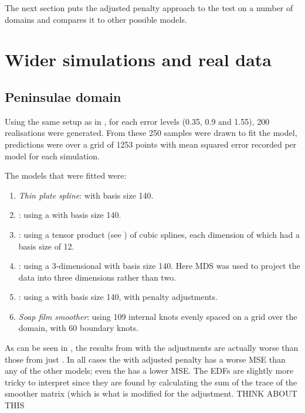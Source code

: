 The next section puts the adjusted penalty approach to the test on a number of domains and compares it to other possible models.

\section{Wider simulations and real data}

\subsection{Peninsulae domain}
\label{wt2bigsim}

Using the same setup as in , for each error levels (0.35, 0.9 and 1.55), 200 realisations were generated. From these 250 samples were drawn to fit the model, predictions were over a grid of 1253 points with mean squared error recorded per model for each simulation. 

The models that were fitted were:
\begin{enumerate}
\item \emph{Thin plate spline}:  with basis size 140.
\item \emph{\mdsap}: using a \tprs with basis size 140.
\item \emph{\mdsap}: using a tensor product (see ) of cubic splines, each dimension of which had a basis size of 12.
\item \emph{\mdsap}: using a 3-dimensional \tprs with basis size 140. Here MDS was used to project the data into three dimensions rather than two.
\item \emph{\mdsap}: using a \tprs with basis size 140, with penalty adjustments.
\item \emph{Soap film smoother}: using 109 internal knots evenly spaced on a grid over the domain, with 60 boundary knots.
\end{enumerate}

As can be seen in , the results from \mdsap with the adjustments are actually worse than those from just \mdsap. In all cases the \mdsap with adjusted penalty has a worse MSE than any of the other models; even the \tprs has a lower MSE. The EDFs are slightly more tricky to interpret since they are found by calculating the sum of the trace of the smoother matrix (which is what is modified for the adjustment. THINK ABOUT THIS 

